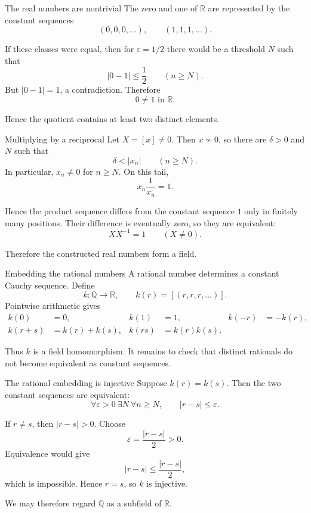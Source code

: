 \documentclass[aspectratio=169,11pt]{beamer}
\newcommand{\Q}{\mathbb Q}
\newcommand{\R}{\mathbb R}
\begin{document}
\begin{frame}{The real numbers are nontrivial}
  The zero and one of \(\R\) are represented by the constant sequences
  \[
    (0,0,0,\ldots),
    \qquad
    (1,1,1,\ldots).
  \]

  If these classes were equal, then for \(\varepsilon=1/2\) there would be a
  threshold \(N\) such that
  \[
    |0-1|\le\frac12
    \qquad(n\ge N).
  \]
  But \(|0-1|=1\), a contradiction.  Therefore
  \[
    \boxed{0\ne1\text{ in }\R.}
  \]

  Hence the quotient contains at least two distinct elements.
\end{frame}

\begin{frame}{Multiplying by a reciprocal}
  Let \(X=[x]\ne0\).  Then \(x\not\sim0\), so there are \(\delta>0\) and
  \(N\) such that
  \[
    \delta<|x_n|
    \qquad(n\ge N).
  \]
  In particular, \(x_n\ne0\) for \(n\ge N\).  On this tail,
  \[
    x_n\frac1{x_n}=1.
  \]

  Hence the product sequence differs from the constant sequence \(1\) only
  in finitely many positions.  Their difference is eventually zero, so they
  are equivalent:
  \[
    \boxed{XX^{-1}=1\qquad(X\ne0).}
  \]

  Therefore the constructed real numbers form a field.
\end{frame}

\begin{frame}{Embedding the rational numbers}
  A rational number determines a constant Cauchy sequence.  Define
  \[
    k\colon\Q\longrightarrow\R,
    \qquad
    k(r)=[(r,r,r,\ldots)].
  \]
  Pointwise arithmetic gives
  \begin{align*}
    k(0)&=0, & k(1)&=1, & k(-r)&=-k(r),\\
    k(r+s)&=k(r)+k(s),
      & k(rs)&=k(r)k(s).
  \end{align*}

  Thus \(k\) is a field homomorphism.  It remains to check that distinct
  rationals do not become equivalent as constant sequences.
\end{frame}

\begin{frame}{The rational embedding is injective}
  Suppose \(k(r)=k(s)\).  Then the two constant sequences are equivalent:
  \[
    \forall\varepsilon>0\ \exists N\ \forall n\ge N,
    \qquad |r-s|\le\varepsilon.
  \]

  If \(r\ne s\), then \(|r-s|>0\).  Choose
  \[
    \varepsilon=\frac{|r-s|}{2}>0.
  \]
  Equivalence would give
  \[
    |r-s|\le\frac{|r-s|}{2},
  \]
  which is impossible.  Hence \(r=s\), so \(k\) is injective.

  We may therefore regard \(\Q\) as a subfield of \(\R\).
\end{frame}
\end{document}
